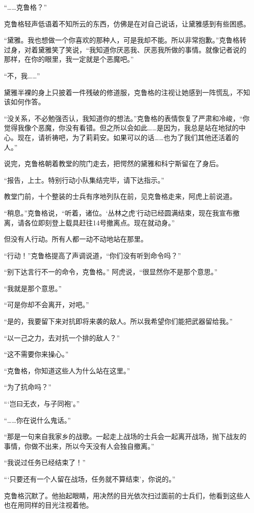 “……克鲁格？”

克鲁格轻声低语着不知所云的东西，仿佛是在对自己说话，让黛雅感到有些困惑。

“黛雅。我也想做一个你喜欢的那种人，可是我却不能。所以非常抱歉。”克鲁格转过身，对着黛雅笑了笑说，“我知道你厌恶我、厌恶我所做的事情。就像记者说的那样，在你的眼里，我一定就是个恶魔吧。”

“不，我……”

黛雅半裸的身上只披着一件残破的修道服，克鲁格的注视让她感到一阵慌乱，不知该如何作答。

“没关系，不必勉强否认，我知道你的想法。”克鲁格的表情恢复了严肃和冷峻，“你觉得我像个恶魔，你没有看错。但之所以会如此……是因为，我总是站在地狱的中心。现在，请祈祷吧，为了莉莉安。如果可以的话……也为了我们其他还活着的人。”

说完，克鲁格朝着教堂的院门走去，把愕然的黛雅和科宁斯留在了身后。

“报告，上士。特别行动小队集结完毕，请下达指示。”

教堂门前，十个整装的士兵有序地列队在前，见克鲁格走来，阿虎上前说道。

“稍息。”克鲁格说，“听着，诸位。‘丛林之虎’行动已经圆满结束，现在我宣布撤离，请各位即刻登上载具赶往14号撤离点。现在就动身。”

但没有人行动。所有人都一动不动地站在那里。

“行动！”克鲁格提高了声调说道，“你们没有听到命令吗？”

“别下达言行不一的命令，克鲁格。” 阿虎说，“很显然你不是那个意思。” 

“我就是那个意思。”

“可是你却不会离开，对吧。”

“是的，我要留下来对抗即将来袭的敌人。所以我希望你们能把武器留给我。”

“以一己之力，去对抗一个排的敌人？”

“这不需要你来操心。”

“克鲁格，你知道这些人为什么站在这里。”

“为了抗命吗？”

“‘岂曰无衣，与子同袍’。”

“……你在说什么鬼话。”

“那是一句来自我家乡的战歌。一起走上战场的士兵会一起离开战场，抛下战友的事情，你做不出来，所以今天没有人会独自撤离。”

“我说过任务已经结束了！”

“‘只要还有一个人留在战场，任务就不算结束’，你说的。”

克鲁格沉默了。他抬起眼睛，用决然的目光依次扫过面前的士兵们，他看到这些人也在用同样的目光注视着他。

